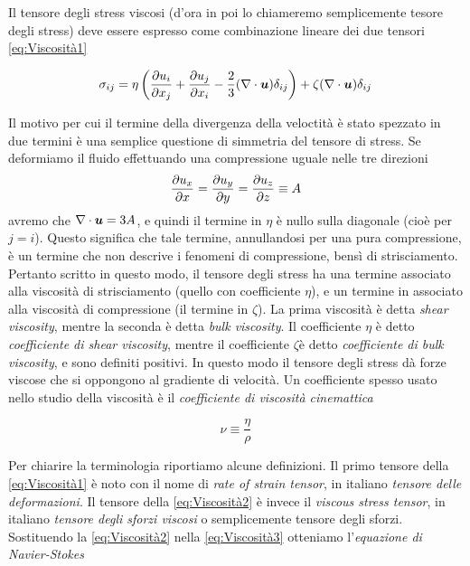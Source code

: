 Il tensore degli stress viscosi (d'ora in poi lo chiameremo semplicemente tesore degli stress) deve essere espresso come combinazione lineare dei due tensori \ref{eq:Viscosità1}
\begin{EQ}
\begin{equation}
\sigma_{ij} = \eta \left( \derP{u_i}{x_j} + \derP{u_j}{x_i} - \dfrac{2}{3}(\Div{u}) \delta_{ij} \right) + \zeta(\Div{u}) \delta_{ij} \label{eq:Viscosità2}
\end{equation}
\end{EQ}
Il motivo per cui il termine della divergenza della veloctità è stato spezzato in due termini è una semplice questione di simmetria del tensore di stress. Se deformiamo il fluido effettuando una compressione uguale nelle tre direzioni 
\begin{equation}
\dfrac{\partial {u_x}}{\partial {x}} = \dfrac{\partial {u_y}}{\partial {y}} = \dfrac{\partial {u_z}}{\partial {z}} \equiv A
\end{equation}
avremo che $\Div{u} = 3A$, e quindi il termine in $\eta$ è nullo sulla diagonale (cioè per $j=i$). Questo significa che tale termine, annullandosi per una pura compressione, è un termine che non descrive i fenomeni di compressione, bensì di strisciamento. Pertanto scritto in questo modo, il tensore degli stress ha una termine associato alla viscosità di strisciamento (quello con coefficiente $\eta$), e un termine in associato alla viscosità di compressione (il termine in $\zeta$). La prima viscosità è detta \textit{shear viscosity}, mentre la seconda è detta \textit{bulk viscosity}. Il coefficiente $\eta$ è detto \textit{coefficiente di shear viscosity}, mentre il coefficiente $\zeta$è detto \textit{coefficiente di bulk viscosity}, e sono definiti positivi. In questo modo il tensore degli stress dà forze viscose che si oppongono al gradiente di velocità.
Un coefficiente spesso usato nello studio della viscosità è il \textit{coefficiente di viscosità cinemattica} 
\begin{EQ}
\begin{equation}
\nu \equiv \dfrac{\eta}{\rho}
\end{equation}
\end{EQ}
Per chiarire la terminologia riportiamo alcune definizioni. Il primo tensore della \ref{eq:Viscosità1} è noto con il nome di \textit{rate of strain tensor}, in italiano \textit{tensore delle deformazioni}. Il tensore della \ref{eq:Viscosità2} è invece il \textit{viscous stress tensor}, in italiano \textit{tensore degli sforzi viscosi} o semplicemente tensore degli sforzi.
Sostituendo la \ref{eq:Viscosità2} nella \ref{eq:Viscosità3} otteniamo l'\textit{equazione di Navier-Stokes}
